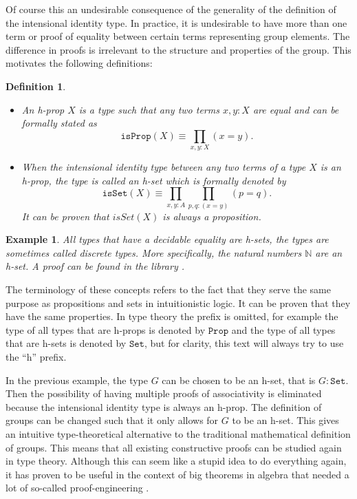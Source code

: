 \documentclass[12pt,a4paper,twoside,xetex]{book} %
\newcommand{\keyword}[1]{\emph{#1}\index{#1}}
\newtheorem{definition}[theorem]{Definition}
\newtheorem{example}[theorem]{Example}
\newcommand{\op}[1]{\mathtt{#1}}
\begin{document}
Of course this an undesirable consequence of the generality of the definition 
of the intensional identity type. In practice, it is undesirable to have more 
than one term or proof of equality between certain terms representing group 
elements. The difference in proofs is irrelevant to the structure and properties 
of the group. This motivates the following definitions:

\begin{definition}\label{hset}
\begin{itemize}
\item  An \keyword{h-prop} $X$ is a type such that any two terms $x,y:X$ are 
equal and can be formally stated as $$\op{isProp}(X) \equiv 
\prod_{x,y:X}(x=y).$$
\item When the intensional identity type between any two terms of a type $X$ is 
an h-prop, the type is called an \keyword{h-set} which is formally denoted by 
$$\op{isSet}(X) \equiv \prod_{x,y:A}\prod_{p,q:(x=y)}(p=q).$$ It can be proven 
that $isSet(X)$ is always a proposition.
\end{itemize}
\end{definition}

\begin{example}
All types that have a decidable equality are h-sets, the types are sometimes called \keyword{discrete types}. More specifically, the natural numbers $\mathbb{N}$ are an h-set. A proof can be found in the library \cite{Moertberg2018}.
\end{example}


The terminology of these concepts refers to the fact that they serve the same 
purpose as propositions and sets in intuitionistic logic. It can be proven that 
they have the same properties. In type theory the prefix is omitted, for 
example the type of all types that are h-props is denoted by $\op{Prop}$ and the 
type of all types that are h-sets is denoted by $\texttt{Set}$, but for clarity, this text will always try to use the ``h'' prefix.

In the previous example, the type $G$ can be chosen to be an h-set, that is $G: 
\op{Set}$. Then the possibility of having multiple proofs of associativity is 
eliminated because the intensional identity type is always an h-prop. The 
definition of groups can be changed such that it only allows for $G$ to be an 
h-set. This gives an intuitive type-theoretical alternative to the 
traditional mathematical definition of groups. This means that all existing 
constructive proofs can be studied again in type theory. Although this can seem 
like a stupid idea to do everything again, it has proven to be useful in the 
context of big theorems in algebra that needed a lot of so-called 
proof-engineering \cite{Gonthier2013}.
\end{document}
